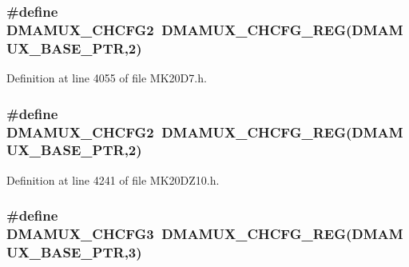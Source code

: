 \subsubsection[{\texorpdfstring{D\+M\+A\+M\+U\+X\+\_\+\+C\+H\+C\+F\+G2}{DMAMUX_CHCFG2}}]{\setlength{\rightskip}{0pt plus 5cm}\#define D\+M\+A\+M\+U\+X\+\_\+\+C\+H\+C\+F\+G2~{\bf D\+M\+A\+M\+U\+X\+\_\+\+C\+H\+C\+F\+G\+\_\+\+R\+EG}({\bf D\+M\+A\+M\+U\+X\+\_\+\+B\+A\+S\+E\+\_\+\+P\+TR},2)}\hypertarget{group___d_m_a_m_u_x___register___accessor___macros_ga1998089c67f104540eb435c07aced432}{}\label{group___d_m_a_m_u_x___register___accessor___macros_ga1998089c67f104540eb435c07aced432}


Definition at line 4055 of file M\+K20\+D7.\+h.

\subsubsection[{\texorpdfstring{D\+M\+A\+M\+U\+X\+\_\+\+C\+H\+C\+F\+G2}{DMAMUX_CHCFG2}}]{\setlength{\rightskip}{0pt plus 5cm}\#define D\+M\+A\+M\+U\+X\+\_\+\+C\+H\+C\+F\+G2~{\bf D\+M\+A\+M\+U\+X\+\_\+\+C\+H\+C\+F\+G\+\_\+\+R\+EG}({\bf D\+M\+A\+M\+U\+X\+\_\+\+B\+A\+S\+E\+\_\+\+P\+TR},2)}\hypertarget{group___d_m_a_m_u_x___register___accessor___macros_ga1998089c67f104540eb435c07aced432}{}\label{group___d_m_a_m_u_x___register___accessor___macros_ga1998089c67f104540eb435c07aced432}


Definition at line 4241 of file M\+K20\+D\+Z10.\+h.

\subsubsection[{\texorpdfstring{D\+M\+A\+M\+U\+X\+\_\+\+C\+H\+C\+F\+G3}{DMAMUX_CHCFG3}}]{\setlength{\rightskip}{0pt plus 5cm}\#define D\+M\+A\+M\+U\+X\+\_\+\+C\+H\+C\+F\+G3~{\bf D\+M\+A\+M\+U\+X\+\_\+\+C\+H\+C\+F\+G\+\_\+\+R\+EG}({\bf D\+M\+A\+M\+U\+X\+\_\+\+B\+A\+S\+E\+\_\+\+P\+TR},3)}\hypertarget{group___d_m_a_m_u_x___register___accessor___macros_gaf6786fc146f407e226ca14ccd1574be6}{}\label{group___d_m_a_m_u_x___register___accessor___macros_gaf6786fc146f407e226ca14ccd1574be6}


